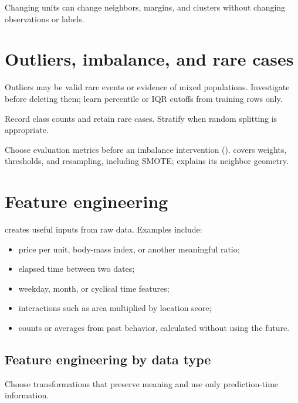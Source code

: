 \begin{keyidea}
Changing units can change neighbors, margins, and clusters without changing observations or labels.
\end{keyidea}

\section{Outliers, imbalance, and rare cases}

Outliers may be valid rare events or evidence of mixed populations. Investigate before deleting them; learn percentile or IQR cutoffs from training rows only.

Record class counts and retain rare cases. Stratify when random splitting is appropriate.

\begin{keyidea}
Choose evaluation metrics before an imbalance intervention ().  covers weights, thresholds, and resampling, including SMOTE;  explains its neighbor geometry.
\end{keyidea}

\section{Feature engineering}

 creates useful inputs from raw data. Examples include:

\begin{itemize}
  \item price per unit, body-mass index, or another meaningful ratio;
  \item elapsed time between two dates;
  \item weekday, month, or cyclical time features;
  \item interactions such as area multiplied by location score;
  \item counts or averages from past behavior, calculated without using the future.
\end{itemize}

\subsection*{Feature engineering by data type}
Choose transformations that preserve meaning and use only prediction-time information.

